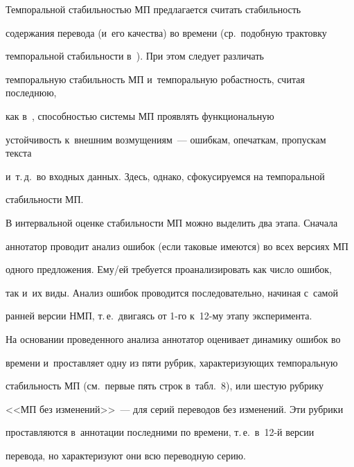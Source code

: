  


  


  Темпоральной стабильностью МП предлагается считать стабильность 


содержания перевода (и~его качества) во времени (ср.\ подобную трактовку 


темпоральной стабильности в~\cite{25-eg}). При этом следует различать 


темпоральную стабильность МП и~темпоральную робастность, считая последнюю, 


как в~\cite{26-eg}, способностью системы МП проявлять функциональную 


устойчивость к~внешним возмущениям~--- ошибкам, опечаткам, пропускам текста 


и~т.\,д.\ во входных данных. Здесь, однако, сфокусируемся на темпоральной 


стабильности МП.


  


  В интервальной оценке стабильности МП можно выделить два этапа. Сначала 


аннотатор проводит анализ ошибок (если таковые имеются) во всех версиях МП 


одного предложения. Ему\!/\!ей требуется проанализировать как число ошибок, 


так и~их виды. Анализ ошибок проводится последовательно, начиная с~самой 


ранней версии НМП, т.\,е.\ двигаясь от 1-го к~12-му этапу эксперимента.


  


  На основании проведенного анализа аннотатор оценивает динамику ошибок во 


времени и~проставляет одну из пяти рубрик, характеризующих темпоральную 


стабильность МП (см.\ первые пять строк в~табл.~8), или шестую руб\-ри\-ку 


<<МП без изменений>>~--- для серий переводов без изменений. Эти рубрики 


проставляются в~аннотации последними по времени, т.\,е.\ в~12-й версии 


перевода, но характеризуют они всю переводную серию.


  


